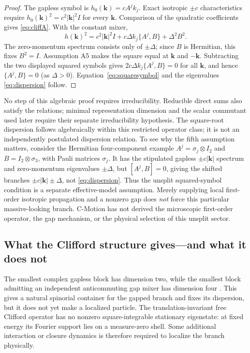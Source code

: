 \documentclass[11pt]{article}
\theoremstyle{definition}
\begin{document}
\begin{proof}
The gapless symbol is $h_0(\mathbf k)=cA^j k_j$.  Exact isotropic $\pm c$
characteristics require $h_0(\mathbf k)^2=c^2|\mathbf k|^2I$ for every $\mathbf k$.
Comparison of the quadratic coefficients gives \eqref{eq:cliffA}.  With the constant mixer,
\[
h(\mathbf k)^2=c^2|\mathbf k|^2I+c\Delta k_j\{A^j,B\}+\Delta^2B^2.
\]
The zero-momentum spectrum consists only of $\pm\Delta$; since $B$ is Hermitian,
this fixes $B^2=I$.  Assumption A5 makes the square equal at $\mathbf k$ and
$-\mathbf k$.  Subtracting the two displayed squared symbols gives
$2c\Delta k_j\{A^j,B\}=0$ for all $\mathbf k$, and hence
$\{A^j,B\}=0$ (as $\Delta>0$).  Equation~\eqref{eq:squaresymbol} and the
eigenvalues \eqref{eq:dispersion} follow.
\end{proof}

No step of this algebraic proof requires irreducibility. Reducible direct sums
also satisfy the relations; minimal representation dimension and the scalar
commutant used later require their separate irreducibility hypothesis.
The square-root dispersion follows algebraically within this restricted operator class;
it is not an independently postulated dispersion relation.  To see why the fifth
assumption matters, consider the Hermitian four-component example
$A^j=\sigma_j\otimes I_2$ and $B=I_2\otimes\sigma_3$, with Pauli matrices
$\sigma_j$.  It has the stipulated gapless $\pm c|\mathbf k|$ spectrum and
zero-momentum eigenvalues $\pm\Delta$, but $[A^j,B]=0$, giving the shifted
branches $\pm c|\mathbf k|\pm\Delta$, not \eqref{eq:dispersion}.
Thus the unsplit squared-symbol condition is a separate effective-model assumption.  Merely supplying local
first-order isotropic propagation and a nonzero gap does \emph{not} force this particular
massive-looking branch.  C-Motion has not derived the microscopic first-order operator,
the gap mechanism, or the physical selection of this unsplit sector.

\subsection{What the Clifford structure gives---and what it does not}

The smallest complex gapless block has dimension two, while the smallest block admitting an
independent anticommuting gap mixer has dimension four
\cite{LawsonMichelsohn1989SpinGeometry}.  This gives a natural spinorial container for the
gapped branch and fixes its dispersion, but it does not yet make a localized particle.  The
translation-invariant free Clifford operator has no nonzero square-integrable stationary
eigenstate: at fixed energy its Fourier support lies on a measure-zero shell.  Some additional
interaction or closure dynamics is therefore required to localize the branch physically.
\end{document}
